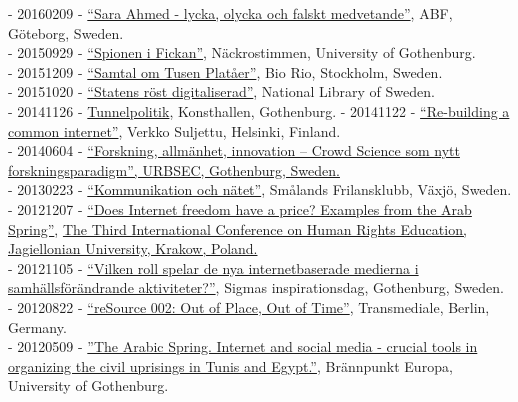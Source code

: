 \documentclass[a4paper,11pt,oneside]{article}
\begin{document}
    - 20160209 - \href{http://www.abfgoteborg.org/index.php/archive/2016/170-filosofiscenen-2016/2208-sarah-ahmed-lycka-och-falskt-medvetande}{``Sara Ahmed - lycka, olycka och falskt medvetande''}, ABF, Göteborg, Sweden.\\
    - 20150929 - \href{http://hum.gu.se/aktuellt/Nyheter/fulltext//nackrostimmen--spionen-i-fickan-som-overvakar-oss.cid1324880}{``Spionen i Fickan''}, Näckrostimmen, University of Gothenburg.\\
    - 20151209 - \href{http://fhp.nu/tusenplataer}{``Samtal om Tusen Platåer''}, Bio Rio, Stockholm, Sweden.\\
    - 20151020 - \href{http://www.kb.se/aktuellt/evenemang/2015/SOUhack/}{``Statens röst digitaliserad''}, National Library of Sweden. \\
    - 20141126 - \href{http://www.wherevent.com/detail/Goteborgs-Konsthall-TUNNELPOLITIK-Forelasning-med-Christopher-Kullenberg}{Tunnelpolitik}, Konsthallen, Gothenburg.
    - 20141122 - \href{https://www.facebook.com/events/622473101197803/}{``Re-building a common internet''}, Verkko Suljettu, Helsinki, Finland. \\
    - 20140604 - \href{http://www.urbsec.se/digitalAssets/1483/1483366_program-urbsec-konferens-2014-06-04.pdf}{``Forskning, allmänhet, innovation – Crowd Science som nytt forskningsparadigm'', URBSEC, Gothenburg, Sweden.} \\
    - 20130223 - \href{http://www.frilansjournalisten.nu/2013/01/sasong-for-arsmoten/}{``Kommunikation och nätet''}, Smålands Frilansklubb, Växjö, Sweden. \\
    - 20121207 - \href{http://letstudio.gu.se/svenska/aktuellt/nyheter/n/christopher-kullenberg-inbjuden-som-talare-pa-internationell-konferens.cid1111971}{``Does Internet freedom have a price? Examples from the Arab Spring''}, \href{http://www.hre2012.uj.edu.pl/invited-speakers}{The Third International Conference on Human Rights Education, Jagiellonian University, Krakow, Poland.} \\
    - 20121105 - \href{https://www.youtube.com/watch?v=Zo24Qy_PU8I}{``Vilken roll spelar de nya internetbaserade medierna i samhällsförändrande aktiviteter?''}, Sigmas inspirationsdag, Gothenburg, Sweden. \\
    - 20120822 - \href{https://transmediale.de/content/resource-002-out-place-out-time}{``reSource 002: Out of Place, Out of Time''}, Transmediale, Berlin, Germany. \\
    - 20120509 - \href{http://pol.gu.se/aktuellt/kalendarium/aktuellt_detalj/?eventId=1777397828}{''The Arabic Spring. Internet and social media - crucial tools in organizing the civil uprisings in Tunis and Egypt.''}, Brännpunkt Europa, University of Gothenburg. \\
\end{document}
